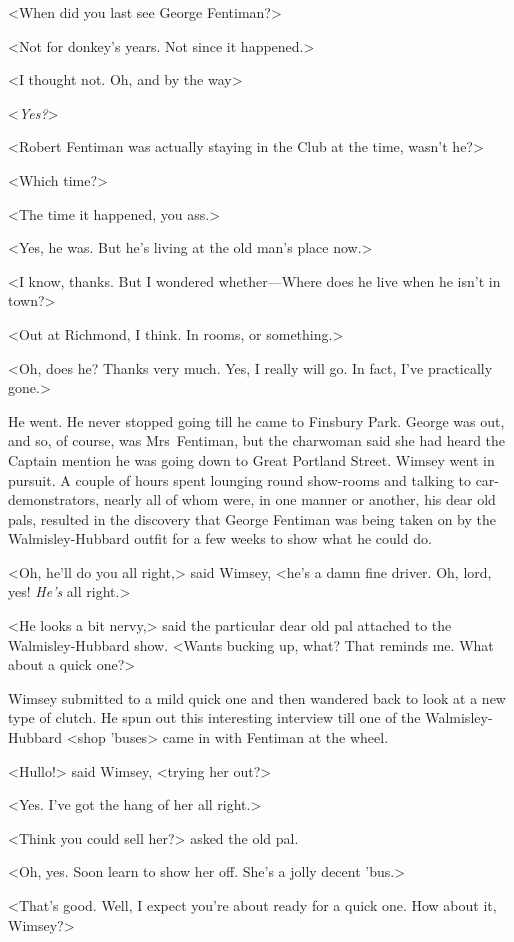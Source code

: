 <When did you last see George Fentiman?>

<Not for donkey's years. Not since it happened.>

<I thought not. Oh, and by the way\longdash>

<\emph{Yes?}>

<Robert Fentiman was actually staying in the Club at the time, wasn't he?>

<Which time?>

<The time it happened, you ass.>

<Yes, he was. But he's living at the old man's place now.>

<I know, thanks. But I wondered whether—Where does he live when he isn't in town?>

<Out at Richmond, I think. In rooms, or something.>

<Oh, does he? Thanks very much. Yes, I really will go. In fact, I've practically gone.>

He went. He never stopped going till he came to Finsbury Park. George was out, and so, of course, was Mrs~Fentiman, but the charwoman said she had heard the Captain mention he was going down to Great Portland Street. Wimsey went in pursuit. A couple of hours spent lounging round show-rooms and talking to car-demonstrators, nearly all of whom were, in one manner or another, his dear old pals, resulted in the discovery that George Fentiman was being taken on by the Walmisley-Hubbard outfit for a few weeks to show what he could do.

<Oh, he'll do you all right,> said Wimsey, <he's a damn fine driver. Oh, lord, yes! \emph{He's} all right.>

<He looks a bit nervy,> said the particular dear old pal attached to the Walmisley-Hubbard show. <Wants bucking up, what? That reminds me. What about a quick one?>

Wimsey submitted to a mild quick one and then wandered back to look at a new type of clutch. He spun out this interesting interview till one of the Walmisley-Hubbard <shop 'buses> came in with Fentiman at the wheel.

<Hullo!> said Wimsey, <trying her out?>

<Yes. I've got the hang of her all right.>

<Think you could sell her?> asked the old pal.

<Oh, yes. Soon learn to show her off. She's a jolly decent 'bus.>

<That's good. Well, I expect you're about ready for a quick one. How about it, Wimsey?>

